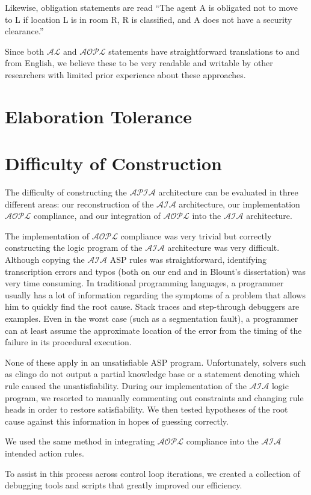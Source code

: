 Likewise, obligation statements are read ``The agent A is obligated not to move to L if location L is in room R, R is classified, and A does not have a security clearance.''

Since both $\mathcal{AL}$ and $\mathcal{AOPL}$ statements have straightforward translations to and from English, we believe these to be very readable and writable by other researchers with limited prior experience about these approaches.

\section{Elaboration Tolerance}

\section{Difficulty of Construction}

The difficulty of constructing the $\mathcal{APIA}$ architecture can be evaluated in three different areas: our reconstruction of the $\mathcal{AIA}$ architecture, our implementation $\mathcal{AOPL}$ compliance, and our integration of $\mathcal{AOPL}$ into the $\mathcal{AIA}$ architecture.

The implementation of $\mathcal{AOPL}$ compliance was very trivial but correctly constructing the logic program of the $\mathcal{AIA}$ architecture was very difficult.
Although copying the $\mathcal{AIA}$ ASP rules was straightforward, identifying transcription errors and typos (both on our end and in Blount's dissertation) was very time consuming.
In traditional programming languages, a programmer usually has a lot of information regarding the symptoms of a problem that allows him to quickly find the root cause.
Stack traces and step-through debuggers are examples.
Even in the worst case (such as a segmentation fault), a programmer can at least assume the approximate location of the error from the timing of the failure in its procedural execution.

None of these apply in an unsatisfiable ASP program.
Unfortunately, solvers such as clingo do not output a partial knowledge base or a statement denoting which rule caused the unsatisfiability.
During our implementation of the $\mathcal{AIA}$ logic program, we resorted to manually commenting out constraints and changing rule heads in order to restore satisfiability.
We then tested hypotheses of the root cause against this information in hopes of guessing correctly.

We used the same method in integrating $\mathcal{AOPL}$ compliance into the $\mathcal{AIA}$ intended action rules.

To assist in this process across control loop iterations, we created a collection of debugging tools and scripts that greatly improved our efficiency.
